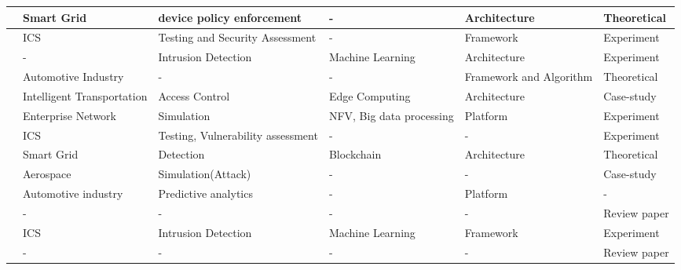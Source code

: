 \begin{table}[H]
\begin{NiceTabular}{p{0.5cm}|p{3cm}|p{2.5cm}|p{2cm}|p{3cm}|p{1.5cm}}
    \cite{giovannipaolosellittoEnablingZeroTrust2021} & Smart Grid & device policy enforcement & - & Architecture & Theoretical \\
    \hline

    \cite{dietzEmployingDigitalTwins2022} & ICS & Testing and Security Assessment & - & Framework & Experiment \\
    \hline

    \cite{sousaELEGANTSecurityCritical2021} & - & Intrusion Detection & Machine Learning & Architecture & Experiment \\
    \hline

    \cite{xuEfficientAuthenticationVehicular2021} & Automotive Industry & - & - & Framework and Algorithm & Theoretical \\
    \hline

   \cite{glenandbensonjamesandguptamaanakandsandhuravicatheyEdgeCentricSecure2021} & Intelligent Transportation & Access Control & Edge Computing & Architecture & Case-study \\
   \hline

   \cite{wangDTCPNDigitalTwin2022} & Enterprise Network & Simulation & NFV, Big data processing & Platform & Experiment \\
   \hline

   \cite{franciaDigitalTwinsIndustrial2021} & ICS & Testing, Vulnerability assessment & - & - & Experiment \\
   \hline

   \cite{lopezDIGITALTWINSINTELLIGENT2021} & Smart Grid & Detection & Blockchain & Architecture & Theoretical \\
    \hline
    
   \cite{adrienbacueDigitalTwinsEnhanced2022} & Aerospace & Simulation(Attack) & - & - & Case-study \\
    \hline
    
   \cite{veledarDigitalTwinsDependability2019} & Automotive industry & Predictive analytics & - & Platform & - \\
   \hline

   \cite{holmesDigitalTwinsCyber2021} & - & - & - & - & Review paper \\
   \hline

   \cite{vargheseDigitalTwinbasedIntrusion2022} & ICS & Intrusion Detection & Machine Learning & Framework & Experiment \\
   \hline

   \cite{rajivfaleiroDigitalTwinCybersecurity2022} & - & - & - & - & Review paper \\
   \hline


\end{NiceTabular}
\end{table}
